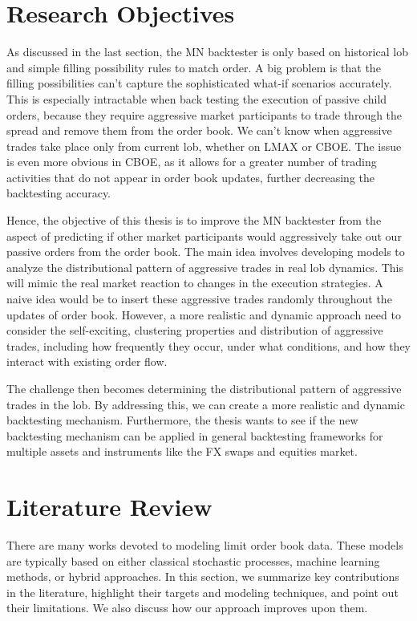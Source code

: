 \section{Research Objectives}
As discussed in the last section, the MN backtester is only based on historical \gls{lob} and simple filling possibility rules to match order. A big problem is that the filling possibilities can't capture the sophisticated what-if scenarios accurately. This is especially intractable when back testing the execution of passive child orders, because they require aggressive market participants to trade through the spread and remove them from the order book. We can't know when aggressive trades take place only from current \gls{lob}, whether on LMAX or CBOE. The issue is even more obvious in CBOE, as it allows for a greater number of trading activities that do not appear in order book updates, further decreasing the backtesting accuracy. 

Hence, the objective of this thesis is to improve the MN backtester from the aspect of predicting if other market participants would aggressively take out our passive orders from the order book. The main idea involves developing models to analyze the distributional pattern of aggressive trades in real \gls{lob} dynamics. This will mimic the real market reaction to changes in the execution strategies. A naive idea would be to insert these aggressive trades randomly throughout the updates of order book. However, a more realistic and dynamic approach need to consider the self-exciting, clustering properties and distribution of aggressive trades, including how frequently they occur, under what conditions, and how they interact with existing order flow.

The challenge then becomes determining the distributional pattern of aggressive trades in the \gls{lob}. By addressing this, we can create a more realistic and dynamic backtesting mechanism. Furthermore, the thesis wants to see if the new backtesting mechanism can be applied in general backtesting frameworks for multiple assets and instruments like the FX swaps and equities market.



\section{Literature Review}
There are many works devoted to modeling limit order book data. These models are typically based on either classical stochastic processes, machine learning methods, or hybrid approaches. In this section, we summarize key contributions in the literature, highlight their targets and modeling techniques, and point out their limitations. We also discuss how our approach improves upon them.

